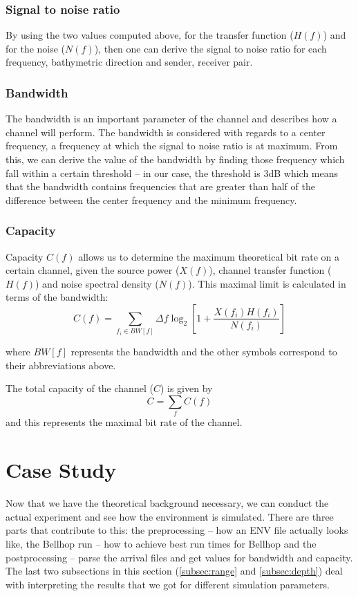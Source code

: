 \documentclass[a4paper]{IEEEtran}
\begin{document}
\subsubsection{Signal to noise ratio}
By using the two values computed above, for the transfer function
($H(f)$) and for the noise ($N(f)$), then one can derive the signal to
noise ratio for each frequency, bathymetric direction and sender,
receiver pair.

\subsubsection{Bandwidth}
The bandwidth is an important parameter of the channel and describes
how a channel will perform. The bandwidth is considered with regards
to a center frequency, a frequency at which the signal to noise ratio
is at maximum. From this, we can derive the value of the bandwidth by
finding those frequency which fall within a certain threshold -- in
our case, the threshold is 3dB which means that the bandwidth contains
frequencies that are greater than half of the difference between the
center frequency and the minimum frequency.

\subsubsection{Capacity}
Capacity $C(f)$ allows us to determine the maximum theoretical bit rate on a
certain channel, given the source power ($X(f)$), channel transfer
function ($H(f)$) and noise spectral density ($N(f)$). This maximal
limit is calculated in terms of the bandwidth: $$C(f) =
\sum\limits_{f_i \in BW[f]} \Delta f \log_2 \left[1 + \frac{X(f_i)
    H(f_i)}{N(f_i)} \right]$$

where $BW[f]$ represents the bandwidth and the other symbols
correspond to their abbreviations above.

The total capacity of the channel ($C$) is given by $$C =
\sum\limits_{f}C(f)$$ and this represents the maximal bit rate of the
channel. 

\section{Case Study}
\label{sec:case}

Now that we have the theoretical background necessary, we can conduct
the actual experiment and see how the environment is simulated. There
are three parts that contribute to this: the preprocessing -- how an
ENV file actually looks like, the Bellhop run -- how to achieve best
run times for Bellhop and the postprocessing -- parse the arrival
files and get values for bandwidth and capacity. The last two subsections
in this section (\ref{subsec:range} and \ref{subsec:depth}) deal with
interpreting the results that we got for different simulation
parameters.
\end{document}
